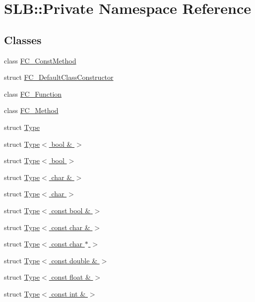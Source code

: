 \hypertarget{namespaceSLB_1_1Private}{}\section{S\+LB\+:\+:Private Namespace Reference}
\label{namespaceSLB_1_1Private}
\subsection*{Classes}
\begin{DoxyCompactItemize}
\item 
class \hyperlink{classSLB_1_1Private_1_1FC__ConstMethod}{F\+C\+\_\+\+Const\+Method}
\item 
struct \hyperlink{structSLB_1_1Private_1_1FC__DefaultClassConstructor}{F\+C\+\_\+\+Default\+Class\+Constructor}
\item 
class \hyperlink{classSLB_1_1Private_1_1FC__Function}{F\+C\+\_\+\+Function}
\item 
class \hyperlink{classSLB_1_1Private_1_1FC__Method}{F\+C\+\_\+\+Method}
\item 
struct \hyperlink{structSLB_1_1Private_1_1Type}{Type}
\item 
struct \hyperlink{structSLB_1_1Private_1_1Type_3_01bool_01_6_01_4}{Type$<$ bool \& $>$}
\item 
struct \hyperlink{structSLB_1_1Private_1_1Type_3_01bool_01_4}{Type$<$ bool $>$}
\item 
struct \hyperlink{structSLB_1_1Private_1_1Type_3_01char_01_6_01_4}{Type$<$ char \& $>$}
\item 
struct \hyperlink{structSLB_1_1Private_1_1Type_3_01char_01_4}{Type$<$ char $>$}
\item 
struct \hyperlink{structSLB_1_1Private_1_1Type_3_01const_01bool_01_6_01_4}{Type$<$ const bool \& $>$}
\item 
struct \hyperlink{structSLB_1_1Private_1_1Type_3_01const_01char_01_6_01_4}{Type$<$ const char \& $>$}
\item 
struct \hyperlink{structSLB_1_1Private_1_1Type_3_01const_01char_01_5_01_4}{Type$<$ const char $\ast$ $>$}
\item 
struct \hyperlink{structSLB_1_1Private_1_1Type_3_01const_01double_01_6_01_4}{Type$<$ const double \& $>$}
\item 
struct \hyperlink{structSLB_1_1Private_1_1Type_3_01const_01float_01_6_01_4}{Type$<$ const float \& $>$}
\item 
struct \hyperlink{structSLB_1_1Private_1_1Type_3_01const_01int_01_6_01_4}{Type$<$ const int \& $>$}

\end{DoxyCompactItemize}
